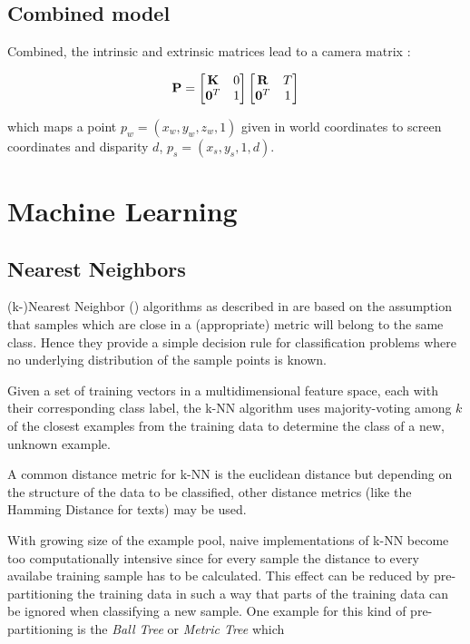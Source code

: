 		\subsection{Combined model}
		Combined, the intrinsic and extrinsic matrices lead to a camera matrix \cite{Szeliski2010}:
		
		\begin{equation}
		\mathbf{P} = \begin{bmatrix}\mathbf{K} & 0\\\mathbf{0}^T & 1\end{bmatrix}
		\begin{bmatrix}\mathbf{R} & T\\\mathbf{0}^T & 1\end{bmatrix}
		\end{equation}
		
		which maps a point $p_w = \left(x_w, y_w, z_w, 1\right)$ given in world coordinates to screen coordinates and disparity $d$, $p_s = \left(x_s, y_s, 1, d\right)$.
		

	
\section { Machine Learning }
	
	\subsection{Nearest Neighbors}
	(k-)Nearest Neighbor () algorithms as described in \cite{Cover1967, Fix1952} are based on the assumption that samples which are close in a (appropriate) metric will belong to the same class. Hence they provide a simple decision rule for classification problems where no underlying distribution of the sample points is known. 
	
	Given a set of training vectors in a multidimensional feature space, each with their corresponding class label, the k-NN algorithm uses majority-voting among $k$ of the closest examples from the training data to determine the class of a new, unknown example.
	
	A common distance metric for k-NN is the euclidean distance but depending on the structure of the data to be classified, other distance metrics (like the Hamming Distance for texts) may be used.
	
	With growing size of the example pool, naive implementations of k-NN become too computationally intensive since for every sample the distance to every availabe training sample has to be calculated. This effect can be reduced by pre-partitioning the training data in such a way that parts of the training data can be ignored when classifying a new sample. One example for this kind of pre-partitioning is the \textit{Ball Tree} or \textit{Metric Tree} which 
	
